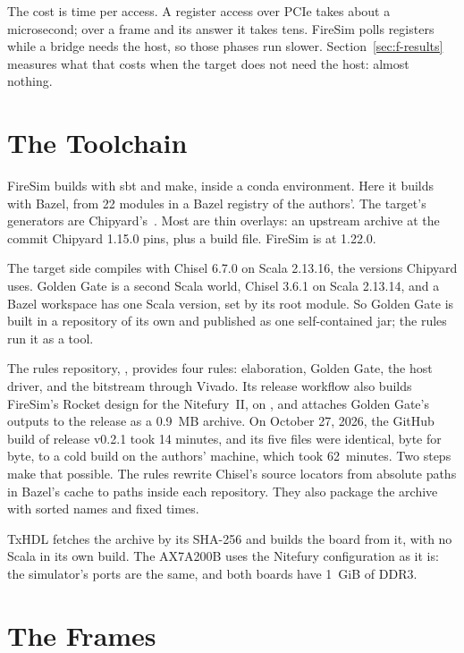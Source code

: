 \documentclass[journal,9pt]{IEEEtran}
\begin{document}
The cost is time per access. A register access over PCIe takes about a
microsecond; over a frame and its answer it takes tens. FireSim polls
registers while a bridge needs the host, so those phases run slower.
Section~\ref{sec:f-results} measures what that costs when the target
does not need the host: almost nothing.

\section{The Toolchain}
\label{sec:f-tool}

FireSim builds with sbt and make, inside a conda environment. Here it
builds with Bazel, from 22 modules in a Bazel registry of the authors'.
The target's generators are Chipyard's~\cite{chipyard}.
Most are thin overlays: an upstream archive at the commit Chipyard
1.15.0 pins, plus a build file. FireSim is at 1.22.0.

The target side compiles with Chisel 6.7.0 on Scala 2.13.16, the
versions Chipyard uses. Golden Gate is a second Scala world, Chisel
3.6.1 on Scala 2.13.14, and a Bazel workspace has one Scala version, set
by its root module. So Golden Gate is built in a repository of its own
and published as one self-contained jar; the rules run it as a tool.

The rules repository, , provides four rules:
elaboration, Golden Gate, the host driver, and the bitstream through
Vivado. Its release workflow also builds FireSim's Rocket design for
the Nitefury~II,  on
, and attaches Golden Gate's outputs to the
release as a 0.9~MB archive. On October 27, 2026, the GitHub build of
release v0.2.1 took 14 minutes, and its five files were identical, byte
for byte, to a cold build on the authors' machine, which took
62~minutes. Two steps make that possible. The rules rewrite Chisel's
source locators from absolute paths in Bazel's cache to paths inside
each repository. They also package the archive with sorted names and
fixed times.

TxHDL fetches the archive by its SHA-256 and builds the board from it,
with no Scala in its own build. The AX7A200B uses the Nitefury
configuration as it is: the simulator's ports are the same, and both
boards have 1~GiB of DDR3.

\section{The Frames}
\label{sec:f-frames}
\end{document}
